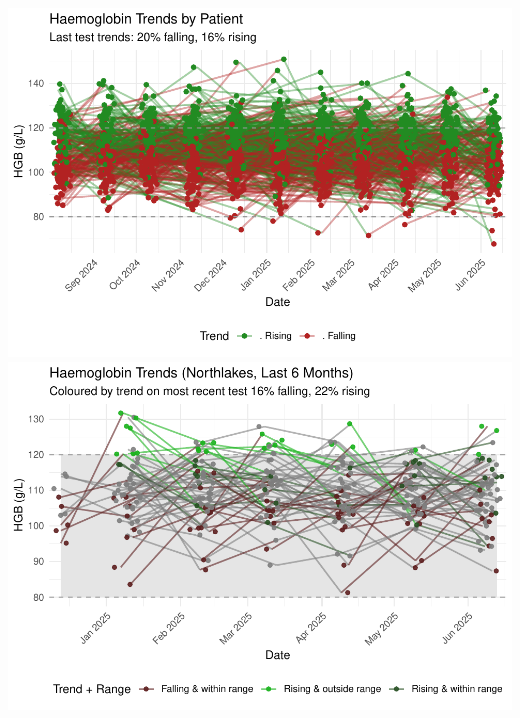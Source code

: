 \documentclass[
]{article}
\begin{document}
\includegraphics{DialysistrackR_files/figure-latex/Individual_patients-1.pdf}
\includegraphics{DialysistrackR_files/figure-latex/Individual_patients-2.pdf}
\end{document}
